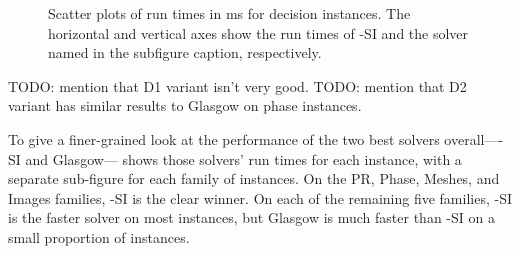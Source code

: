 \begin{figure}[htb]
{    }
    \caption{Scatter plots of run times in ms for decision instances.
            The horizontal and vertical axes show the run times of \McSplit-SI and the
            solver named in the subfigure caption, respectively.}
    \label{figure:si-decision-scatter}
\end{figure}

TODO: mention that D1 variant isn't very good.
TODO: mention that D2 variant has similar results to Glasgow on phase instances.

\FloatBarrier

To give a finer-grained look at the performance of the two best solvers overall---\McSplit-SI and
Glasgow--- shows those solvers' run times for each
instance, with a separate sub-figure for each family of instances.  On the PR, Phase, Meshes,
and Images families, \McSplit-SI is the clear winner.   On each of
the remaining five families, \McSplit-SI is the faster solver on most instances, but Glasgow
is much faster than \McSplit-SI on a small proportion of instances.

